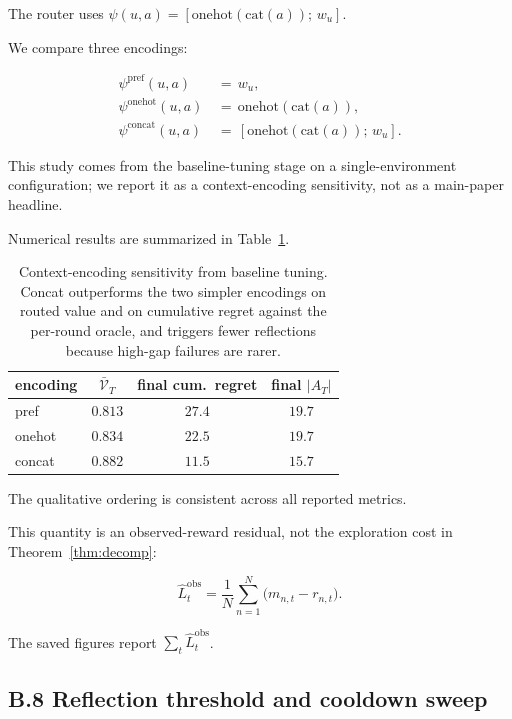 \documentclass{article} %
\begin{document}
\label{app:ctx-type}

The router uses $\psi(u,a)=[\mathrm{onehot}(\mathrm{cat}(a));\,w_u]$.

We compare three encodings:

\begin{align}
\label{eq:app-ctx-pref}
\psi^{\mathrm{pref}}(u,a) &\,=\, w_u,\\
\label{eq:app-ctx-onehot}
\psi^{\mathrm{onehot}}(u,a) &\,=\, \mathrm{onehot}(\mathrm{cat}(a)),\\
\label{eq:app-ctx-concat}
\psi^{\mathrm{concat}}(u,a) &\,=\, [\mathrm{onehot}(\mathrm{cat}(a));\,w_u].
\end{align}

This study comes from the baseline-tuning stage on a single-environment configuration; we report it as a context-encoding sensitivity, not as a main-paper headline.

Numerical results are summarized in Table~\ref{tab:app-ctx-type}.

\begin{table}[h]
\centering
\small
\begin{tabular}{lccc}
\toprule
encoding & $\bar{\mathcal{V}}_T$ & final cum.\ regret & final $|A_T|$ \\
\midrule
pref     & $0.813$ & $27.4$ & $19.7$ \\
onehot   & $0.834$ & $22.5$ & $19.7$ \\
concat   & $0.882$ & $11.5$ & $15.7$ \\
\bottomrule
\end{tabular}
\caption{Context-encoding sensitivity from baseline tuning. Concat outperforms the two simpler encodings on routed value and on cumulative regret against the per-round oracle, and triggers fewer reflections because high-gap failures are rarer.}
\label{tab:app-ctx-type}
\end{table}

The qualitative ordering is consistent across all reported metrics.

This quantity is an observed-reward residual, not the exploration cost in
Theorem~\ref{thm:decomp}:

\begin{equation}
\label{eq:app-emp-LT-recap}
\hat L_t^{\mathrm{obs}}
=
\frac{1}{N}\sum_{n=1}^{N}\big(m_{n,t}-r_{n,t}\big).
\end{equation}

The saved figures report \(\sum_t\hat L_t^{\mathrm{obs}}\).

\subsection{B.8 Reflection threshold and cooldown sweep}
\end{document}
